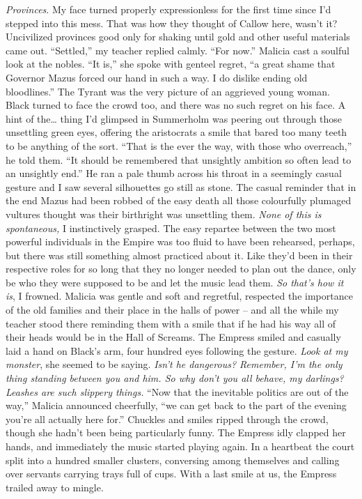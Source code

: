 \documentclass[12pt, openany]{book}
\begin{document}
\textit{Provinces}. My face turned properly expressionless for the first time since I’d stepped into this mess. That was how they thought of Callow here, wasn’t it? Uncivilized provinces good only for shaking until gold and other useful materials came out.
“Settled,” my teacher replied calmly. “For now.”
Malicia cast a soulful look at the nobles.
“It is,” she spoke with genteel regret, “a great shame that Governor Mazus forced our hand in such a way. I do dislike ending old bloodlines.”
The Tyrant was the very picture of an aggrieved young woman. Black turned to face the crowd too, and there was no such regret on his face. A hint of the… thing I’d glimpsed in Summerholm was peering out through those unsettling green eyes, offering the aristocrats a smile that bared too many teeth to be anything of the sort.
“That is the ever the way, with those who overreach,” he told them. “It should be remembered that unsightly ambition so often lead to an unsightly end.”
He ran a pale thumb across his throat in a seemingly casual gesture and I saw several silhouettes go still as stone. The casual reminder that in the end Mazus had been robbed of the easy death all those colourfully plumaged vultures thought was their birthright was unsettling them. \textit{None of this is spontaneous,} I instinctively grasped. The easy repartee between the two most powerful individuals in the Empire was too fluid to have been rehearsed, perhaps, but there was still something almost practiced about it. Like they’d been in their respective roles for so long that they no longer needed to plan out the dance, only be who they were supposed to be and let the music lead them.
\textit{So that’s how it is}, I frowned. Malicia was gentle and soft and regretful, respected the importance of the old families and their place in the halls of power – and all the while my teacher stood there reminding them with a smile that if he had his way all of their heads would be in the Hall of Screams. The Empress smiled and casually laid a hand on Black’s arm, four hundred eyes following the gesture. \textit{Look at my monster}, she seemed to be saying. \textit{Isn’t he dangerous? Remember, I’m the only thing standing between you and him. So why don’t you all behave, my darlings? Leashes are such slippery things.}
“Now that the inevitable politics are out of the way,” Malicia announced cheerfully, “we can get back to the part of the evening you’re all actually here for.”
Chuckles and smiles ripped through the crowd, though she hadn’t been being particularly funny. The Empress idly clapped her hands, and immediately the music started playing again. In a heartbeat the court split into a hundred smaller clusters, conversing among themselves and calling over servants carrying trays full of cups. With a last smile at us, the Empress trailed away to mingle.
\end{document}
